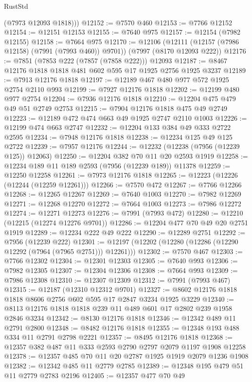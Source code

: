 \begin{lexlean}{RustStd}
\begin{coremodule}
{\begin{coremodule}
{{{{{{{{{{{{{{{{{{{{{{{{{{{{{{{{{{{{{{{{{{{        (@7973 @12093 @1818)))
@12152 := @7570 @460
@12153 := @7766 @12152
@12154 := @12151 @12153
@12155 := @7640 @975
@12157 := @12154 (@7982 @12155)
@12158 := @7664 @975
@12170 := @12106
    (@12111 (@12157 (@7986 @12158) (@7991 (@7993 @460)) @9701))
    (@7997 (@8170 @12093 @222))
@12176 := @7851 (@7853 @222 (@7857 (@7858 @222))) @12093
@12187 := @8467 @12176 @1818 @1818 @481 @602 @595 @17 @1925 @2756 @1925 @3237
@12189 := @7913 @12176 @1818
@12197 := @12189 @467 @480 @977 @572 @1925 @2754 @2110 @993
@12199 := @7927 @12176 @1818
@12202 := @12199 @480 @977 @2754
@12204 := @7936 @12176 @1818
@12210 := @12204 @475 @479 @49 @51 @2749 @2753
@12215 := @7904 @12176 @1818 @475 @49 @2749
@12223 := @12189 @472 @474 @663 @49 @1925 @2747 @2110 @1003
@12226 := @12199 @474 @663 @2747
@12232 := @12204 @133 @384 @49 @333 @2722 @2595
@12234 := @7948 @12176 @1818
@12238 := @12234 @125 @49 @125 @2722
@12239 := @7957 @12176
@12244 := @12232 (@12238 (@7956 (@12239 @125)) @12063)
@12250 := @12204 @382 @70 @11 @20 @2593 @1919
@12258 := @12234 @189 @11 @189 @2593 (@7956 (@12239 @189)) @11378
@12259 := @12250 @12258
@12261 := @7973 @12176 @1818
@12265 := @12223 (@12226 (@12244 (@12259 @12261)))
@12266 := @7570 @472
@12267 := @7766 @12266
@12268 := @12265 @12267
@12269 := @7640 @1003
@12270 := @7982 @12269
@12271 := @12268 @12270
@12272 := @7664 @1003
@12273 := @7986 @12272
@12274 := @12271 @12273
@12276 := @7991 (@7993 @472)
@12280 := @12210 (@12215 (@12274 @12276 @9701))
@12286 := @12204 @477 @70 @49 @20 @2751 @1919
@12289 := @12234 @222 @49 @222
@12290 := @12289 @2751
@12292 := @7956 (@12239 @222)
@12301 := @12197 (@12202 (@12280 (@12286 (@12290 @12292 (@7964 (@7965 @2751))) @12261)))
@12302 := @7570 @467
@12303 := @7766 @12302
@12304 := @12301 @12303
@12305 := @7640 @993
@12306 := @7982 @12305
@12307 := @12304 @12306
@12308 := @7664 @993
@12309 := @7986 @12308
@12310 := @12307 @12309
@12312 := @7991 (@7993 @467)
@12315 := @12187 (@12310 @12312 @9701)
@12327 := @8602 @12176 @1818 @1818 @8606 @2756 @602 @595 @17 @2847 @3234 @1925 @3229
@12340 := @8113 @12176 @1818 @1818 @239 @11 @489 @601 @17 @2802 @239 @1958 @2846 @3234
@12342 := @8130 @12176 @1818
@12346 := @12342 @489 @11 @2791 @2800
@12348 := @8482 @12176 @1818
@12355 := @12348 @193 @488 @334 @11 @2791 @2798 @2221
@12357 := @8495 @12176 @1818
@12368 := @12357 @382 @487 @11 @333 @2593 @2790 @2797 @2079 @1197 @1908 @12258
@12378 := @12357 @485 @70 @11 @20 @2787 @1925 @1919 @2079 @1236 @1908
@12382 := @12342 @485 @11 @2779 @2785
@12389 := @12348 @195 @479 @51 @11 @2779 @2783 @2196
@12405 := @12357
    @477
    @70
    @49
}}}}}}}}}}}}}}}}}}}}}}}}}}}}}}}}}}}}}}}}}}}
\end{coremodule}}
\end{coremodule}
\end{lexlean}
